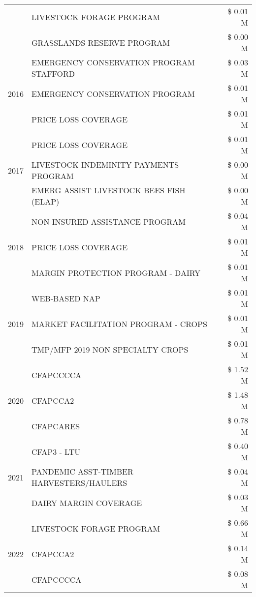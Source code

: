 \begin{tabular}{llr}
 & LIVESTOCK FORAGE PROGRAM & \$ 0.01 M \\
 & GRASSLANDS RESERVE PROGRAM & \$ 0.00 M \\
\cline{1-3}
\multirow[t]{3}{*}{2016} & EMERGENCY CONSERVATION PROGRAM STAFFORD & \$ 0.03 M \\
 & EMERGENCY CONSERVATION PROGRAM & \$ 0.01 M \\
 & PRICE LOSS COVERAGE & \$ 0.01 M \\
\cline{1-3}
\multirow[t]{3}{*}{2017} & PRICE LOSS COVERAGE & \$ 0.01 M \\
 & LIVESTOCK INDEMINITY PAYMENTS PROGRAM & \$ 0.00 M \\
 & EMERG ASSIST LIVESTOCK BEES FISH (ELAP) & \$ 0.00 M \\
\cline{1-3}
\multirow[t]{3}{*}{2018} & NON-INSURED ASSISTANCE PROGRAM & \$ 0.04 M \\
 & PRICE LOSS COVERAGE & \$ 0.01 M \\
 & MARGIN PROTECTION PROGRAM - DAIRY & \$ 0.01 M \\
\cline{1-3}
\multirow[t]{3}{*}{2019} & WEB-BASED NAP & \$ 0.01 M \\
 & MARKET FACILITATION PROGRAM - CROPS & \$ 0.01 M \\
 & TMP/MFP 2019 NON SPECIALTY CROPS & \$ 0.01 M \\
\cline{1-3}
\multirow[t]{3}{*}{2020} & CFAPCCCCA & \$ 1.52 M \\
 & CFAPCCA2 & \$ 1.48 M \\
 & CFAPCARES & \$ 0.78 M \\
\cline{1-3}
\multirow[t]{3}{*}{2021} & CFAP3 - LTU & \$ 0.40 M \\
 & PANDEMIC ASST-TIMBER HARVESTERS/HAULERS & \$ 0.04 M \\
 & DAIRY MARGIN COVERAGE & \$ 0.03 M \\
\cline{1-3}
\multirow[t]{3}{*}{2022} & LIVESTOCK FORAGE PROGRAM & \$ 0.66 M \\
 & CFAPCCA2 & \$ 0.14 M \\
 & CFAPCCCCA & \$ 0.08 M \\
\cline{1-3}
\bottomrule
\end{tabular}

